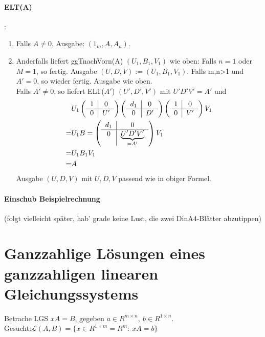 \documentclass[a4paper,DIV15,BCOR12mm]{article}
\begin{document}
\paragraph{ELT(A)}:
\begin{enumerate}
    \item Falls $A\neq0$, Ausgabe: $(1_m,A,A_n)$.
    \item Anderfalls liefert ggTnachVorn(A) $(U_1,B_1,V_1)$ wie
    oben: Falls $n=1$ oder $M=1$, so fertig. Ausgabe
    $(U,D,V):=(U_1,B_1,V_1)$. Falls m,n>1 und $A'=0$, so wieder
    fertig. Ausgabe wie oben.\\
    Falls $A'\neq 0$, so liefert ELT($A'$) $(U',D',V')$ mit
    $U'D'V'=A'$ und
    \begin{align*}
        & U_1 \left(\begin{tabular}{c|c} $1$& 0\\\hline 0 & $U'$
    \end{tabular}\right) \left(\begin{tabular}{c|c} $d_1$& 0\\\hline 0 & $D'$
    \end{tabular}\right) \left(\begin{tabular}{c|c} $1$& 0\\\hline 0 & $V'$
    \end{tabular}\right) V_1\\
    =&U_1 B=\left(\begin{tabular}{c|c} $d_1$& 0\\\hline 0 & $\underbrace{U'D'V'}_{=A'}$
    \end{tabular}\right) V_1\\
    =&U_1B_1V_1\\
    =&A
    \end{align*}
    Ausgabe $(U,D,V)$ mit $U,D,V$ passend wie in obiger Formel.
\end{enumerate}
\paragraph{Einschub Beispielrechnung} (folgt vielleicht später, hab'
grade keine Lust, die zwei DinA4-Blätter abzutippen)

\section{Ganzzahlige Lösungen eines ganzzahligen linearen
Gleichungssystems} Betrache LGS $xA=B$, gegeben $a\in R^{m\times
n},\ b\in R^{1\times n}$.\\
Gesucht:$\mathcal{L}(A,B)=\{  x\in R^{1\times m}=R^m:\ xA=b  \}$
\end{document}

